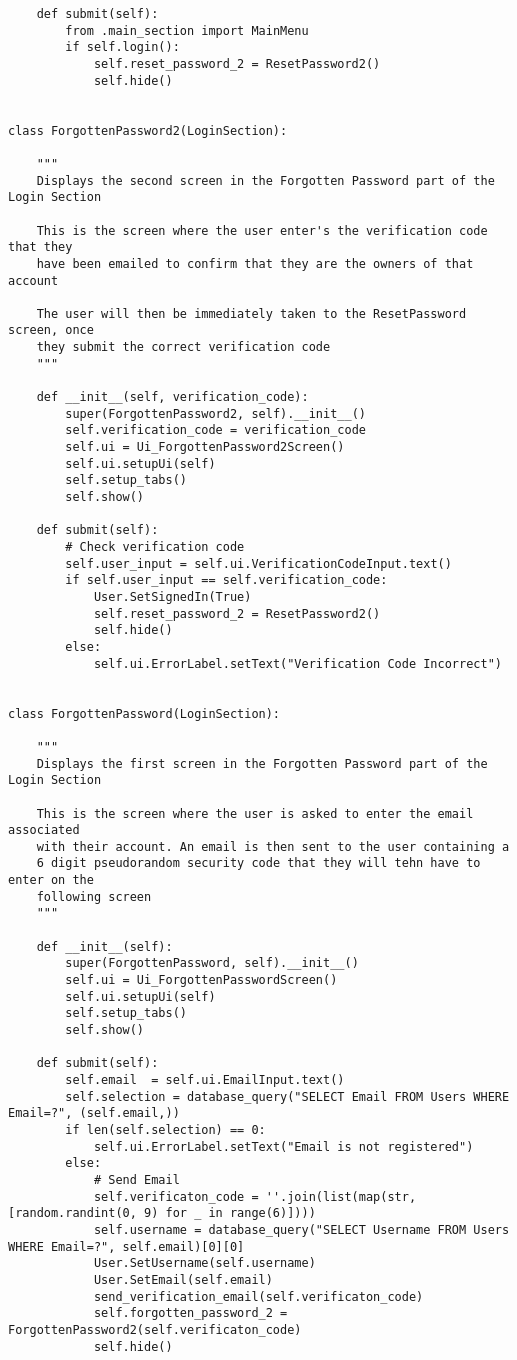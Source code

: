 \documentclass{article}
\begin{document}
\begin{lstlisting}
    def submit(self):
        from .main_section import MainMenu
        if self.login():
            self.reset_password_2 = ResetPassword2()
            self.hide()


class ForgottenPassword2(LoginSection):

    """
    Displays the second screen in the Forgotten Password part of the Login Section

    This is the screen where the user enter's the verification code that they
    have been emailed to confirm that they are the owners of that account

    The user will then be immediately taken to the ResetPassword screen, once
    they submit the correct verification code
    """

    def __init__(self, verification_code):
        super(ForgottenPassword2, self).__init__()
        self.verification_code = verification_code
        self.ui = Ui_ForgottenPassword2Screen()
        self.ui.setupUi(self)
        self.setup_tabs()
        self.show()

    def submit(self):
        # Check verification code
        self.user_input = self.ui.VerificationCodeInput.text()
        if self.user_input == self.verification_code:
            User.SetSignedIn(True)
            self.reset_password_2 = ResetPassword2()
            self.hide()
        else:
            self.ui.ErrorLabel.setText("Verification Code Incorrect")


class ForgottenPassword(LoginSection):

    """
    Displays the first screen in the Forgotten Password part of the Login Section

    This is the screen where the user is asked to enter the email associated
    with their account. An email is then sent to the user containing a
    6 digit pseudorandom security code that they will tehn have to enter on the
    following screen
    """

    def __init__(self):
        super(ForgottenPassword, self).__init__()
        self.ui = Ui_ForgottenPasswordScreen()
        self.ui.setupUi(self)
        self.setup_tabs()
        self.show()

    def submit(self):
        self.email  = self.ui.EmailInput.text()
        self.selection = database_query("SELECT Email FROM Users WHERE Email=?", (self.email,))
        if len(self.selection) == 0:
            self.ui.ErrorLabel.setText("Email is not registered")
        else:
            # Send Email
            self.verificaton_code = ''.join(list(map(str, [random.randint(0, 9) for _ in range(6)])))
            self.username = database_query("SELECT Username FROM Users WHERE Email=?", self.email)[0][0]
            User.SetUsername(self.username)
            User.SetEmail(self.email)
            send_verification_email(self.verificaton_code)
            self.forgotten_password_2 = ForgottenPassword2(self.verificaton_code)
            self.hide()



\end{lstlisting}
\end{document}

